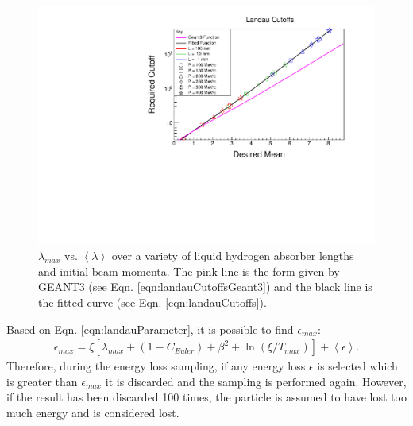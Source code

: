 \begin{figure}
  \centering
    \includegraphics[width=\textwidth]{Figures/landau_cutoffs} 
  \caption[$\lambda_{max}$ vs. $\left<\lambda\right>$ over a variety of liquid hydrogen absorber lengths and initial beam momenta.]{$\lambda_{max}$ vs. $\left<\lambda\right>$ over a variety of liquid hydrogen absorber lengths and initial beam momenta. The pink line is the form given by GEANT3 (see Eqn. \ref{eqn:landauCutoffsGeant3}) and the black line is the fitted curve (see Eqn. \ref{eqn:landauCutoffs}).}
  \label{fig:landau_cutoffs}
\end{figure}

Based on Eqn. \ref{eqn:landauParameter}, it is possible to find $\epsilon_{max}$:
\begin{align*}
\epsilon_{max}=\xi[\lambda_{max}+(1-C_{Euler})+\beta^2+\ln(\xi/T_{max})]+\left<\epsilon\right>.
\end{align*}
Therefore, during the energy loss sampling, if any energy loss $\epsilon$ is selected which is greater than $\epsilon_{max}$ it is discarded and the sampling is performed again. However, if the result has been discarded 100 times, the particle is assumed to have lost too much energy and is considered lost.

